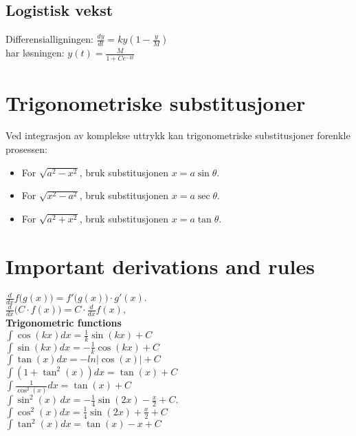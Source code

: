 \documentclass[a4paper,7pt,fleqn]{article}
\begin{document}
\begin{multicols}{3}
\subsection{Logistisk vekst}
Differensialligningen:
\( \frac{dy}{dt} = ky\left(1 - \frac{y}{M}\right) \) \\
har løsningen:
\( y(t) = \frac{M}{1 + Ce^{-kt}} \) \\

\section{Trigonometriske substitusjoner}
Ved integrasjon av komplekse uttrykk kan trigonometriske substitusjoner forenkle prosessen:
\begin{itemize}
    \item For \(\sqrt{a^2 - x^2}\), bruk substitusjonen \(x = a \sin\theta\).
    \item For \(\sqrt{x^2 - a^2}\), bruk substitusjonen \(x = a \sec\theta\).
    \item For \(\sqrt{a^2 + x^2}\), bruk substitusjonen \(x = a \tan\theta\).
\end{itemize}



































\section*{Important derivations and rules}

\( \frac{d}{dx} f\big(g(x)\big) = f'\big(g(x)\big) \cdot g'(x). \) \\
\( \frac{d}{dx}\big(C \cdot f(x)\big) = C \cdot \frac{d}{dx}f(x), \) \\


\textbf{Trigonometric functions} \\[-0.2cm]
\( \int \cos(kx) dx = \frac{1}{k}\sin(kx) + C \) \\
\( \int \sin(kx) dx = -\frac{1}{k}\cos(kx) + C \) \\
\( \int \tan(x) dx = -ln\left|\cos(x)\right| + C \) \\
\( \int (1+\tan^2(x)) dx = \tan(x) + C \) \\
\( \int \frac{1}{\cos^2(x)} dx = \tan(x) +C \) \\
\( \int \sin^2(x) \, dx = -\frac{1}{4} \sin(2x) - \frac{x}{2} + C. \) \\
\( \int \cos^2(x) dx = \frac{1}{4}\sin(2x) + \frac{x}{2}+C \) \\
\( \int \tan^2(x) dx = \tan(x) - x + C \) \\



\end{multicols}
\end{document}
